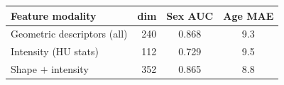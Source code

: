 \begin{tabular}{lrcc}
\toprule
Feature modality & dim & Sex AUC & Age MAE \\
\midrule
Geometric descriptors (all) & 240 & 0.868 & 9.3 \\
Intensity (HU stats) & 112 & 0.729 & 9.5 \\
Shape $+$ intensity & 352 & 0.865 & 8.8 \\
\bottomrule
\end{tabular}
